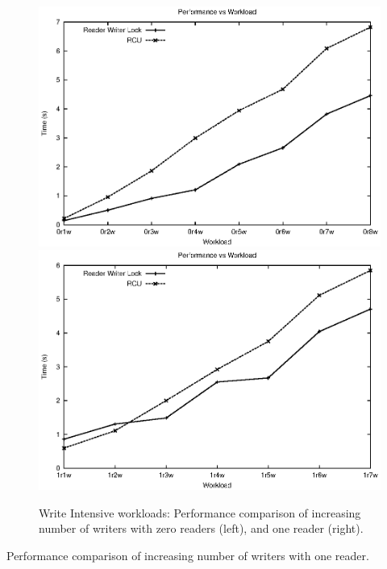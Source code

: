 \documentclass[a4paper]{article}
\begin{document}
\begin{figure}[tph]
\centering
\includegraphics[scale = 0.45]{../images/graphs/micro_0r_vw}
\includegraphics[scale = 0.45]{../images/graphs/micro_1r_vw}
\caption{Write Intensive workloads: Performance comparison of increasing number of writers with zero readers (left), and one reader (right).}
\label{img:micro_01r_vw}
\end{figure}

\begin{table}[tph]
\begin{center}

\end{center}
\label{tbl:micro_1r_vw}
\caption{Performance comparison of increasing number of writers with one reader.}
\end{table}

\pagebreak
\end{document}
